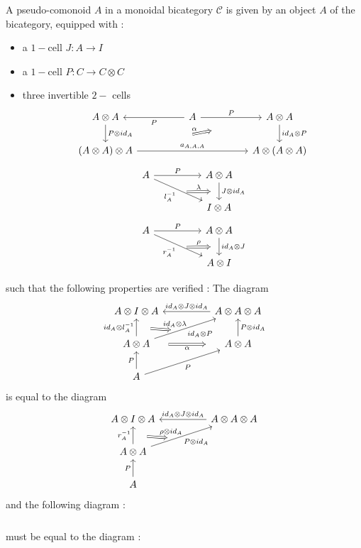 \documentclass[10pt]{llncs}
\begin{document}
\begin{definition}
A pseudo-comonoid $A$ in a monoidal bicategory $\mathcal{C}$ is given by an object $A$ of the bicategory, equipped with :
\begin{itemize}
\item a $1-$cell $J: A \rightarrow I$
\item a $1-$cell $P:C \rightarrow C \otimes C$
\item three invertible $2-$ cells 
$$\begin{tikzcd}
A \otimes A
\arrow{d}{ P \otimes id_A}
&&
A
\arrow{ll}{P}
\arrow{rr}{P}
&&
A \otimes A
\arrow{d}{id_A \otimes P}
\\
(A \otimes A) \otimes A
\arrow{rrrr}{a_{A,A,A}}
\arrow[Rightarrow, shorten >=1.8cm, shorten <=2.0cm]{rrrru}{\alpha}
&&&&
A \otimes (A \otimes A)
\end{tikzcd}
$$
$$
\begin{tikzcd}
A
\arrow{rr}{P}
\arrow[swap]{rrd}{l_{A}^{-1}}[name=A]{}
&&
A \otimes A
\arrow{d}{J \otimes id_A}[name=B]{}
\\
&&
I \otimes A
\arrow[Rightarrow, from=A,to=B, shorten >=0.3cm, shorten <=0.3cm]{}{\lambda}
\end{tikzcd}
$$
$$
\begin{tikzcd}
A
\arrow{rr}{P}
\arrow[swap]{rrd}{r_{A}^{-1}}[name=A]{}
&&
A \otimes A
\arrow{d}{  id_A\otimes J}[name=B]{}
\\
&&
A \otimes I
\arrow[Rightarrow, from=A,to=B, shorten >=0.3cm, shorten <=0.3cm]{}{\rho}
\end{tikzcd}
$$
\end{itemize}
such that the following properties are verified : 
The diagram $$
\begin{tikzcd}
A \otimes I \otimes A
&&
A \otimes A \otimes A
\arrow[swap]{ll}{id_A \otimes J \otimes id_A}
\\
A \otimes A
\arrow{u}{id_A \otimes l_{A}^{-1}}[name=A]{}
\arrow[Rightarrow, swap,shorten >=0.5cm, shorten <=0.5cm]{rr}{\alpha}
\arrow[swap]{urr}{id_A \otimes P}[name=B]{}
&&
A \otimes A
\arrow[swap]{u}{P \otimes id_A}
\\
A
\arrow{u}{P}
\arrow[swap]{urr}{P}
\arrow[Rightarrow, from=A,to=B, shorten >=0.5cm, shorten <=0.5cm]{}{id_A \otimes \lambda}
\end{tikzcd}
$$
is equal to the diagram
$$
\begin{tikzcd}
A \otimes I \otimes A
&&
A \otimes A \otimes A
\arrow[swap]{ll}{id_A \otimes J \otimes id_A}
\\
A \otimes A
\arrow{u}{r_{A}^{-1}}[name=A]{}
\arrow[swap]{urr}{P \otimes id_A}[name=B]{}
\\
A
\arrow{u}{P}
\arrow[Rightarrow, from=A,to=B, shorten >=0.5cm, shorten <=0.5cm]{}{\rho \otimes id_A }
\end{tikzcd}
$$
and the following diagram :
$$
\begin{tikzcd}
\end{tikzcd}
$$

must be equal to the diagram : 
$$
\begin{tikzcd}
\end{tikzcd}
$$
\end{definition}
\end{document}

